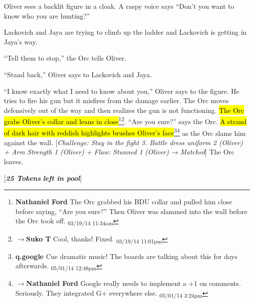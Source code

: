 Oliver sees a backlit figure in a cloak.  A raspy voice says ``Don't you want to know who you are hunting?''



Lackovich and Jaya are trying to climb up the ladder and Lackovich is getting in Jaya's way.  



``Tell them to stop,'' the Orc tells Oliver.

``Stand back,'' Oliver says to Lackovich and Jaya.



``I know exactly what I need to know about you,'' Oliver says to the figure.  He tries to fire his gun but it misfires from the damage earlier.   The Orc moves defensively out of the way and then realizes the gun is not functioning.  \hl{The Orc grabs Oliver's collar and leans in close}\footnote{\textbf{Nathaniel Ford }The Orc grabbed his BDU collar and pulled him close before saying, ``Are you sure?'' Then Oliver was slammed into the wall before the Orc took off. \textsubscript{03/19/14 11:34am}}\footnote{$\rightarrow$\textbf{Suko T }Cool, thanks!  Fixed. \textsubscript{03/19/14 11:01pm}}.  ``Are you sure?'' says the Orc.  \hl{A strand of dark hair with reddish highlights brushes Oliver's face}\footnote{\textbf{q.google }Cue dramatic music!  The boards are talking about this for days afterwards. \textsubscript{05/01/14 12:48pm}}\footnote{$\rightarrow$\textbf{Nathaniel Ford }Google really needs to implement a +1 on comments. Seriously. They integrated G+ everywhere else. \textsubscript{05/01/14 3:24pm}} as the Orc slams him against the wall.  {[}\textit{Challenge: Stay in the fight 3.  Battle dress uniform 2 (Oliver) + Arm Strength 1 (Oliver) + }\textit{ {\color[RGB]{255,0,0}Flaw: Stunned 1 (Oliver)} }\textit{ → Matched}{]}  The Orc leaves.





{[}\textit{\textbf{25 Tokens}}\textit{\textbf{ left in pool}}{]}








